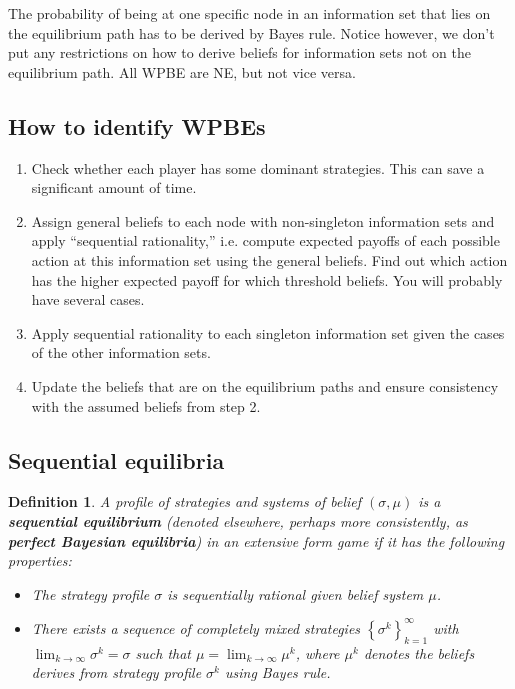 \documentclass[letter, 11pt]{article}
\theoremstyle{basic}
\newtheorem{definition}{Definition}[section]
\begin{document}
\begin{spacing}{1.0}
The probability of being at one specific node in an information set that
lies on the equilibrium path has to be derived by Bayes rule. Notice
however, we don't put any restrictions on how to derive beliefs for
information sets not on the equilibrium path. All WPBE are NE, but not vice versa.

\subsection{How to identify WPBEs}

\begin{enumerate}
\item Check whether each player has some dominant strategies. This can save
  a significant amount of time.
\item Assign general beliefs to each node with non-singleton information
  sets and apply ``sequential rationality,'' i.e. compute expected payoffs
  of each possible action at this information set using the general
  beliefs. Find out which action has the higher expected payoff for which
  threshold beliefs. You will probably have several cases.
\item Apply sequential rationality to each singleton information set given
  the cases of the other information sets.
\item Update the beliefs that are on the equilibrium paths and ensure
  consistency with the assumed beliefs from step 2.
\end{enumerate}

\subsection{Sequential equilibria}

\begin{definition}
  A profile of strategies and systems of belief $(\sigma, \mu)$ is a
  \textbf{sequential equilibrium} (denoted elsewhere, perhaps more
  consistently, as \textbf{perfect Bayesian equilibria}) in an extensive
  form game if it has the following properties:
  \begin{itemize}
  \item The strategy profile $\sigma$ is sequentially rational given belief
    system $\mu$.
  \item There exists a sequence of completely mixed strategies
    $\left\{\sigma^k\right\}_{k=1}^\infty$ with $\lim_{k \to \infty} \sigma^k =
    \sigma$ such that $\mu = \lim_{k \to \infty} \mu^k$, where $\mu^k$ denotes
    the beliefs derives from strategy profile $\sigma^k$ using Bayes rule.
  \end{itemize}
\end{definition}


\end{spacing}
\end{document}
